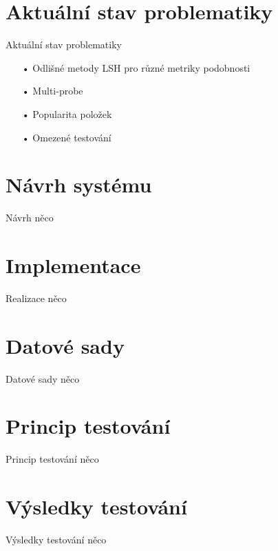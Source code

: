 \documentclass[aspectratio=169,28pt]{beamer}
\begin{document}
\section{Aktuální stav problematiky}
\begin{frame}{Aktuální stav problematiky}
		\begin{itemize}
		\item[•] Odlišné metody LSH pro různé metriky podobnosti
		\item[•] Multi-probe
		\item[•] Popularita položek
		\item[•] Omezené testování 
		\end{itemize}
\end{frame}

\section{Návrh systému}
\begin{frame}{Návrh}
		něco
\end{frame}

\section{Implementace}
\begin{frame}{Realizace}
		něco
\end{frame}

\section{Datové sady}

\begin{frame}{Datové sady}
		něco
\end{frame}

\section{Princip testování}

\begin{frame}{Princip testování}
		něco
\end{frame}

\section{Výsledky testování}

\begin{frame}{Výsledky testování}
		něco\cite{handbook}
\end{frame}
\end{document}
